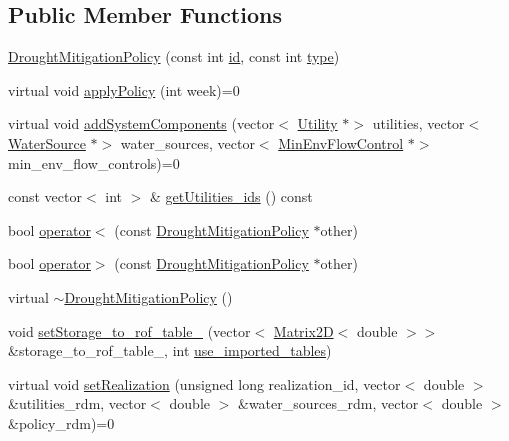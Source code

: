 \subsection*{Public Member Functions}
\begin{DoxyCompactItemize}
\item 
\mbox{\hyperlink{classDroughtMitigationPolicy_a00cce0117a5bc0c446727e0c0c59a8df}{Drought\+Mitigation\+Policy}} (const int \mbox{\hyperlink{classDroughtMitigationPolicy_abf3ed19ed98e0d74dc9ae24094be640b}{id}}, const int \mbox{\hyperlink{classDroughtMitigationPolicy_aaea5016d1462bec889cb8df85aececc6}{type}})
\item 
virtual void \mbox{\hyperlink{classDroughtMitigationPolicy_a76c1a85eaf7707306fe173b6437cc31d}{apply\+Policy}} (int week)=0
\item 
virtual void \mbox{\hyperlink{classDroughtMitigationPolicy_aaab042a79d781afe8e08753b7012372a}{add\+System\+Components}} (vector$<$ \mbox{\hyperlink{classUtility}{Utility}} $\ast$$>$ utilities, vector$<$ \mbox{\hyperlink{classWaterSource}{Water\+Source}} $\ast$$>$ water\+\_\+sources, vector$<$ \mbox{\hyperlink{classMinEnvFlowControl}{Min\+Env\+Flow\+Control}} $\ast$$>$ min\+\_\+env\+\_\+flow\+\_\+controls)=0
\item 
const vector$<$ int $>$ \& \mbox{\hyperlink{classDroughtMitigationPolicy_aad53e4f995e3fe18b580f39d15daeefc}{get\+Utilities\+\_\+ids}} () const
\item 
bool \mbox{\hyperlink{classDroughtMitigationPolicy_a0bf7d0fa94377ae6814e529daf0204c4}{operator$<$}} (const \mbox{\hyperlink{classDroughtMitigationPolicy}{Drought\+Mitigation\+Policy}} $\ast$other)
\item 
bool \mbox{\hyperlink{classDroughtMitigationPolicy_a576d3ddb09dc9372898a63c0949d08a6}{operator$>$}} (const \mbox{\hyperlink{classDroughtMitigationPolicy}{Drought\+Mitigation\+Policy}} $\ast$other)
\item 
virtual \mbox{\hyperlink{classDroughtMitigationPolicy_a91ff1ca816dcb044e1e10a6c2a8e56a0}{$\sim$\+Drought\+Mitigation\+Policy}} ()
\item 
void \mbox{\hyperlink{classDroughtMitigationPolicy_a75710a6ab73213223222b3472f9251c0}{set\+Storage\+\_\+to\+\_\+rof\+\_\+table\+\_\+}} (vector$<$ \mbox{\hyperlink{classMatrix2D}{Matrix2D}}$<$ double $>$$>$ \&storage\+\_\+to\+\_\+rof\+\_\+table\+\_\+, int \mbox{\hyperlink{classDroughtMitigationPolicy_ace2a2425f6608c34a3189c11445978a1}{use\+\_\+imported\+\_\+tables}})
\item 
virtual void \mbox{\hyperlink{classDroughtMitigationPolicy_a5d2033543cacca1e412eebef5106eab4}{set\+Realization}} (unsigned long realization\+\_\+id, vector$<$ double $>$ \&utilities\+\_\+rdm, vector$<$ double $>$ \&water\+\_\+sources\+\_\+rdm, vector$<$ double $>$ \&policy\+\_\+rdm)=0
\end{DoxyCompactItemize}
